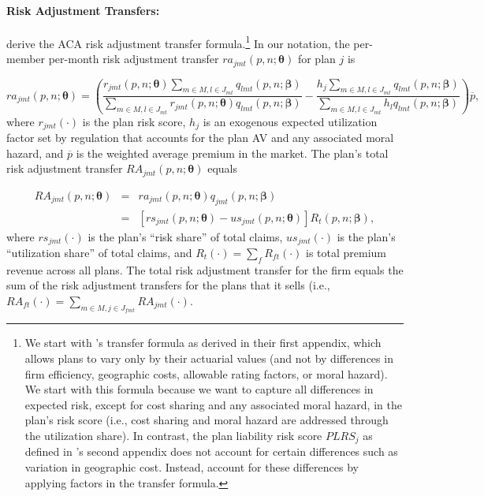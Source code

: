 \documentclass[12pt]{article}
\begin{document}
\paragraph{Risk Adjustment Transfers:} 
\citet{Pope2014} derive the ACA risk adjustment transfer formula.\footnote{We start with \citet{Pope2014}'s transfer formula as derived in their first appendix, which allows plans to vary only by their actuarial values (and not by differences in firm efficiency, geographic costs, allowable rating factors, or moral hazard).  We start with this formula because we want to capture all differences in expected risk, except for cost sharing and any associated moral hazard, in the plan's risk score (i.e., cost sharing and moral hazard are addressed through the utilization share).  In contrast, the plan liability risk score   $PLRS_j$ as defined in \citet{Pope2014}'s second appendix does not account for certain differences such as variation in geographic cost.  Instead, \citet{Pope2014} account for these differences by applying factors in the transfer formula.}  In our notation, the per-member per-month risk adjustment transfer $ra_{jmt}(\textit{p},\textit{n};\boldsymbol{\theta})$ for plan $j$ is

\vspace{-0.2in}
\begin{equation*}
	ra_{jmt}(\textit{p},\textit{n};\boldsymbol{\theta}) = \left(\frac{r_{jmt}(\textit{p},\textit{n};\boldsymbol{\theta})\sum_{m \in M, l \in J_{mt}} q_{lmt}(\textit{p},\textit{n};\boldsymbol{\beta})}{\sum_{m \in M, l \in J_{mt}} r_{jmt}(\textit{p},\textit{n};\boldsymbol{\theta}) q_{lmt}(\textit{p},\textit{n};\boldsymbol{\beta})}    -     \frac{h_j\sum_{m \in M, l \in J_{mt}} q_{lmt}(\textit{p},\textit{n};\boldsymbol{\beta})}{\sum_{m \in M, l \in J_{mt}} h_l q_{lmt}(\textit{p},\textit{n};\boldsymbol{\beta})}\right)\overline{p},
\end{equation*}
where $r_{jmt}(\cdot)$ is the plan risk score, $h_j$ is an exogenous expected utilization factor set by regulation that accounts for the plan AV and any associated moral hazard, and $\overline{p}$ is the weighted average premium in the market.  The plan's total risk adjustment transfer $RA_{jmt}(\textit{p},\textit{n};\boldsymbol{\theta})$ equals

\vspace{-0.4in}
\begin{eqnarray}
\label{eqn:ra_formula}
	RA_{jmt}(\textit{p},\textit{n};\boldsymbol{\theta}) &=& ra_{jmt}(\textit{p},\textit{n};\boldsymbol{\theta})  q_{jmt}(\textit{p},\textit{n};\boldsymbol{\beta}) \nonumber \\
	&= & \left[rs_{jmt}(\textit{p},\textit{n};\boldsymbol{\theta})  - us_{jmt}(\textit{p},\textit{n};\boldsymbol{\theta})  \right] R_t(\textit{p},\textit{n};\boldsymbol{\beta}),
\end{eqnarray}
where $rs_{jmt}(\cdot)$ is the plan's ``risk share'' of total claims, $us_{jmt}(\cdot)$ is the plan's ``utilization share'' of total claims, and $R_t(\cdot) = \sum_f R_{ft}(\cdot)$ is total premium revenue across all plans. The total risk adjustment transfer for the firm equals the sum of the risk adjustment transfers for the plans that it sells (i.e., $RA_{ft}(\cdot) = \sum_{m \in M, j \in J_{fmt}} RA_{jmt}(\cdot)$.
	
\end{document}

